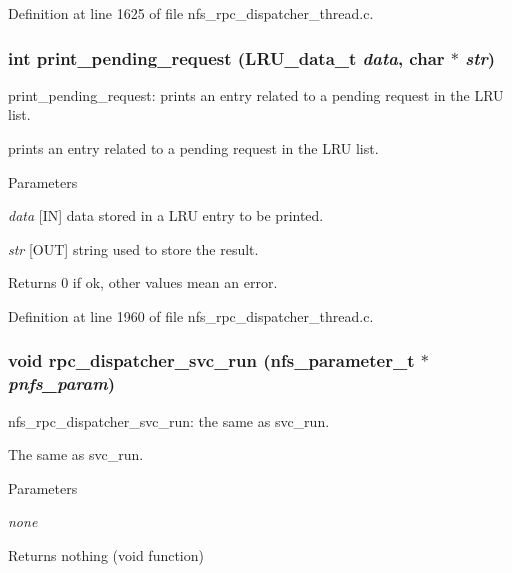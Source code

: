 Definition at line 1625 of file nfs\_\-rpc\_\-dispatcher\_\-thread.c.
\subsubsection[{print\_\-pending\_\-request}]{\setlength{\rightskip}{0pt plus 5cm}int print\_\-pending\_\-request (LRU\_\-data\_\-t {\em data}, \/  char $\ast$ {\em str})}\label{nfs__rpc__dispatcher__thread_8c_a9c4d5812b5445e27dec115567787e7c9}
print\_\-pending\_\-request: prints an entry related to a pending request in the LRU list.

prints an entry related to a pending request in the LRU list.


\begin{DoxyParams}{Parameters}
\item[{\em data}][IN] data stored in a LRU entry to be printed. \item[{\em str}][OUT] string used to store the result.\end{DoxyParams}
\begin{DoxyReturn}{Returns}
0 if ok, other values mean an error. 
\end{DoxyReturn}


Definition at line 1960 of file nfs\_\-rpc\_\-dispatcher\_\-thread.c.
\subsubsection[{rpc\_\-dispatcher\_\-svc\_\-run}]{\setlength{\rightskip}{0pt plus 5cm}void rpc\_\-dispatcher\_\-svc\_\-run (nfs\_\-parameter\_\-t $\ast$ {\em pnfs\_\-param})}\label{nfs__rpc__dispatcher__thread_8c_a6eb51d2ceaa2943d99cb326f9b3d9968}
nfs\_\-rpc\_\-dispatcher\_\-svc\_\-run: the same as svc\_\-run.

The same as svc\_\-run.


\begin{DoxyParams}{Parameters}
\item[{\em none}]\end{DoxyParams}
\begin{DoxyReturn}{Returns}
nothing (void function) 
\end{DoxyReturn}


